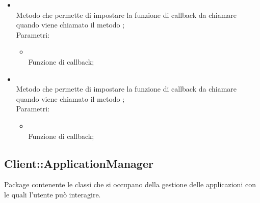 \begin{itemize}
\begin{itemize}
		\item[]  \\
		Metodo che permette di impostare la funzione di callback da chiamare quando viene chiamato il metodo ;\\
		Parametri:
		\begin{itemize}
			\item {} \\
			Funzione di callback;
		\end{itemize}
		\item[]  \\
		Metodo che permette di impostare la funzione di callback da chiamare quando viene chiamato il metodo ;\\
		Parametri:
		\begin{itemize}
			\item {} \\
			Funzione di callback;
		\end{itemize}
	\end{itemize}
\end{itemize}

\subsection{Client::ApplicationManager}
Package contenente le classi che si occupano della gestione delle applicazioni con le quali l'utente può interagire.
